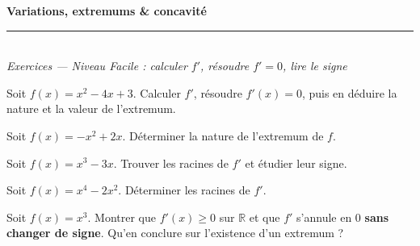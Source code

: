 \documentclass[11pt,a4paper]{article}
\newcommand{\R}{\mathbb{R}}
\begin{document}
\begin{center}
{\LARGE\bfseries\color{primarydark} Variations, extremums \& concavité}\\[2pt]
{\color{primary}\rule{0.5\textwidth}{1.2pt}}\\[4pt]
{\small\itshape Exercices --- Niveau Facile : calculer $f'$, résoudre $f'=0$, lire le signe}
\end{center}
\vspace{2mm}

\begin{exo}[1]
Soit $f(x)=x^2-4x+3$. Calculer $f'$, résoudre $f'(x)=0$, puis en déduire la nature
et la valeur de l'extremum.
\end{exo}

\begin{exo}[2]
Soit $f(x)=-x^2+2x$. Déterminer la nature de l'extremum de $f$.
\end{exo}

\begin{exo}[3]
Soit $f(x)=x^3-3x$. Trouver les racines de $f'$ et étudier leur signe.
\end{exo}

\begin{exo}[4]
Soit $f(x)=x^4-2x^2$. Déterminer les racines de $f'$.
\end{exo}

\begin{exo}[5]
Soit $f(x)=x^3$. Montrer que $f'(x)\geq 0$ sur $\R$ et que $f'$ s'annule en $0$
\textbf{sans changer de signe}. Qu'en conclure sur l'existence d'un extremum ?
\end{exo}
\end{document}
